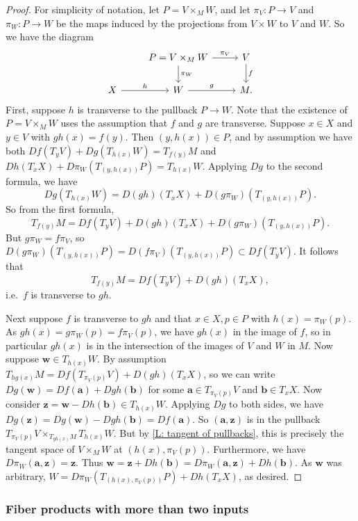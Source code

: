 \begin{proof}
	For simplicity of notation, let $P = V \times_MW$, and let $\pi_V \colon P \to V$ and $\pi_W \colon P \to W$ be the maps induced by the projections from $V \times W$ to $V$ and $W$.
	So we have the diagram
	\[
	\begin{tikzcd}
		& P = V \times_M W \arrow[r, "\pi_V"] \arrow[d, "\pi_W"] & V \arrow[d, "f"] \\
		X \arrow[r, "h"] & W \arrow[r, "g"]& M.
	\end{tikzcd}
	\]
	First, suppose $h$ is transverse to the pullback $P \to W$.
	Note that the existence of $P = V \times_M W$ uses the assumption that $f$ and $g$ are transverse.
	Suppose $x \in X$ and $y \in V$ with $gh(x) = f(y)$.
	Then $(y,h(x)) \in P$, and by assumption we have both $Df(T_yV)+Dg(T_{h(x)}W) = T_{f(y)}M$ and
	$Dh(T_xX)+D\pi_W(T_{(y,h(x))}P) = T_{h(x)}W$.
	Applying $Dg$ to the second formula, we have
	$$Dg(T_{h(x)}W) = D(gh)(T_xX)+D(g\pi_W)(T_{(y,h(x))}P).$$
	So from the first formula,
	$$T_{f(y)}M = Df(T_yV)+D(gh)(T_xX)+D(g\pi_W)(T_{(y,h(x))}P).$$
	But $g\pi_W = f\pi_V$, so $D(g\pi_W)(T_{(y,h(x))}P) = D(f\pi_V)(T_{(y,h(x))}P) \subset Df(T_yV)$.
	It follows that
	$$T_{f(y)}M = Df(T_yV)+D(gh)(T_xX),$$
	i.e.\ $f$ is transverse to $gh$.

	Next suppose $f$ is transverse to $gh$ and that $x \in X, p \in P$ with $h(x) = \pi_W(p)$.
	As $gh(x) = g\pi_W(p) = f\pi_V(p)$, we have $gh(x)$ in the image of $f$, so in particular $gh(x)$ is in the intersection of the images of $V$ and $W$ in $M$.
	Now suppose $\mathbf w \in T_{h(x)}W$.
	By assumption $T_{hg(x)}M = Df(T_{\pi_V(p)}V)+D(gh)(T_xX)$, so we can write $Dg(\mathbf w) = Df(\mathbf a)+Dgh(\mathbf b)$ for some $\mathbf a \in T_{\pi_V(p)}V$ and $\mathbf b \in T_x X$.
	Now consider $\mathbf z = \mathbf w-Dh(\mathbf b) \in T_{h(x)}W$.
	Applying $Dg$ to both sides, we have $Dg(\mathbf z) = Dg(\mathbf w)-Dgh(\mathbf b) = Df(\mathbf a)$.
	So $(\mathbf a,\mathbf z)$ is in the pullback $T_{\pi_V(p)}V \times_{T_{gh(x)}M} T_{h(x)}W$.
	But by \cref{L: tangent of pullbacks}, this is precisely the tangent space of $V \times_MW$ at $(h(x),\pi_V(p))$.
	Furthermore, we have $D\pi_W(\mathbf a,\mathbf z) = \mathbf z$.
	Thus $\mathbf w = \mathbf z+Dh(\mathbf b) = D\pi_W(\mathbf a,\mathbf z)+Dh(\mathbf b)$.
	As $\mathbf w$ was arbitrary, $W = D\pi_W(T_{(h(x),\pi_V(p))}P)+Dh(T_xX)$, as desired.
\end{proof}

\subsubsection{Fiber products with more than two inputs}\label{S:multitransversality}


